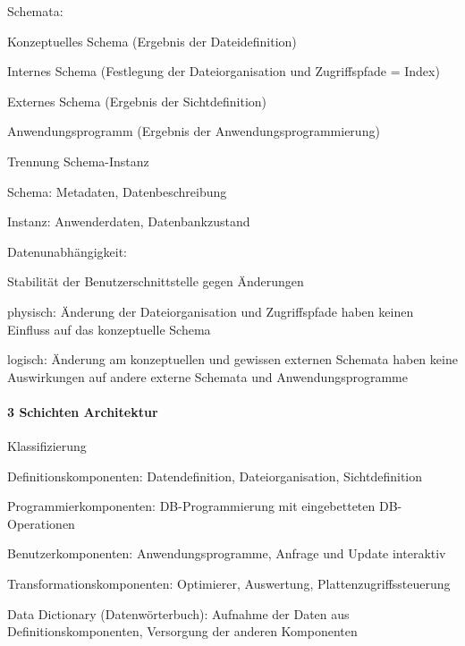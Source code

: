 \documentclass[a4paper]{article}
\begin{document}
\begin{multicols}{3}
    Schemata:
    \begin{itemize*}
        \item Konzeptuelles Schema (Ergebnis der Dateidefinition)
        \item Internes Schema (Festlegung der Dateiorganisation und Zugriffspfade = Index)
        \item Externes Schema (Ergebnis der Sichtdefinition)
        \item Anwendungsprogramm (Ergebnis der Anwendungsprogrammierung)
        \item Trennung Schema-Instanz
        \begin{itemize*}
            \item Schema: Metadaten, Datenbeschreibung
            \item Instanz: Anwenderdaten, Datenbankzustand
        \end{itemize*}
    \end{itemize*}

    Datenunabhängigkeit:
    \begin{itemize*}
        \item Stabilität der Benutzerschnittstelle gegen Änderungen
        \item physisch: Änderung der Dateiorganisation und Zugriffspfade haben keinen Einfluss auf das konzeptuelle Schema
        \item logisch: Änderung am konzeptuellen und gewissen externen Schemata haben keine Auswirkungen auf andere externe Schemata und Anwendungsprogramme
    \end{itemize*}

    \paragraph{3 Schichten Architektur}
    Klassifizierung
    \begin{itemize*}
        \item Definitionskomponenten: Datendefinition, Dateiorganisation, Sichtdefinition
        \item Programmierkomponenten: DB-Programmierung mit eingebetteten DB-Operationen
        \item Benutzerkomponenten: Anwendungsprogramme, Anfrage und Update interaktiv
        \item Transformationskomponenten: Optimierer, Auswertung, Plattenzugriffssteuerung
        \item Data Dictionary (Datenwörterbuch): Aufnahme der Daten aus Definitionskomponenten, Versorgung der anderen Komponenten
    \end{itemize*}


\end{multicols}
\end{document}
